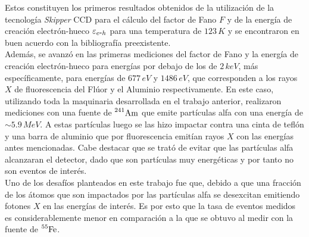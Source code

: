Estos constituyen los primeros resultados obtenidos de la utilización de la tecnología \textit{Skipper} CCD para el cálculo del factor de Fano $F$ y de la energía de creación electrón-hueco $\varepsilon_{e\mbox{-}h}$ para una temperatura de $123\,\si{K}$ y se encontraron en buen acuerdo con la bibliografía preexistente\cite{Ryan, Alig, Kotov}.\\
\indent Además, se avanzó en las primeras mediciones del factor de Fano y la energía de creación electrón-hueco para energías por debajo de los de $2\,\si{keV}$\cite{TesisKevin}, más específicamente, para energías de $677\,\si{eV}$ y $1486\,\si{eV}$, que corresponden a los rayos $X$ de fluorescencia del Flúor y el Aluminio respectivamente. En este caso, utilizando toda la maquinaria desarrollada en el trabajo anterior, realizaron mediciones con una fuente de $\prescript{241}{}{\mbox{Am}}$ que emite partículas alfa con una energía de $\sim 5.9\,\si{MeV}$. A estas partículas luego se las hizo impactar contra una cinta de teflón y una barra de aluminio que por fluorescencia emitían rayos $X$ con las energías antes mencionadas. Cabe destacar que se trató de evitar que las partículas alfa alcanzaran el detector, dado que son partículas muy energéticas y por tanto no son eventos de interés.\\
\indent Uno de los desafíos planteados en este trabajo fue que, debido a que una fracción de los átomos que son impactados por las partículas alfa se desexcitan emitiendo fotones $X$ en las energías de interés. Es por esto que la tasa de eventos medidos es considerablemente menor en comparación a la que se obtuvo al medir con la fuente de $\prescript{55}{}{\mbox{Fe}}$.

